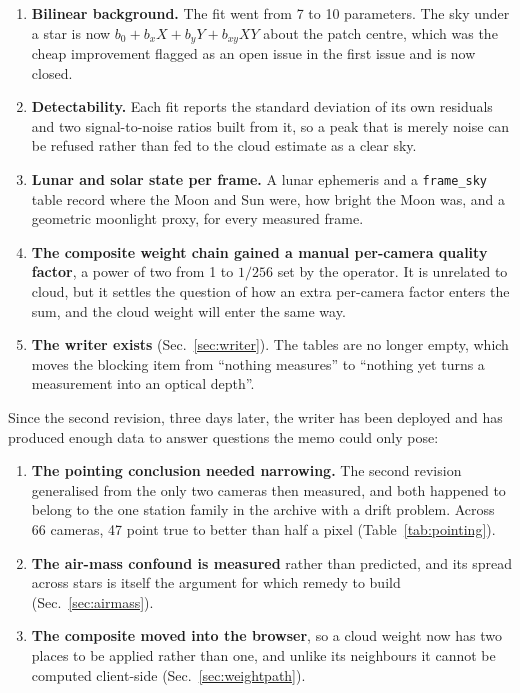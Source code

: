 \documentclass[11pt,a4paper]{article}
\begin{document}
\begin{enumerate}
  \item \textbf{Bilinear background.} The fit went from 7 to 10 parameters. The
    sky under a star is now $b_0+b_xX+b_yY+b_{xy}XY$ about the patch centre,
    which was the cheap improvement flagged as an open issue in the first issue
    and is now closed.
  \item \textbf{Detectability.} Each fit reports the standard deviation of its
    own residuals and two signal-to-noise ratios built from it, so a peak that
    is merely noise can be refused rather than fed to the cloud estimate as a
    clear sky.
  \item \textbf{Lunar and solar state per frame.} A lunar ephemeris and a
    \texttt{frame\_sky} table record where the Moon and Sun were, how bright the
    Moon was, and a geometric moonlight proxy, for every measured frame.
  \item \textbf{The composite weight chain gained a manual per-camera quality
    factor}, a power of two from 1 to $1/256$ set by the operator. It is
    unrelated to cloud, but it settles the question of how an extra per-camera
    factor enters the sum, and the cloud weight will enter the same way.
  \item \textbf{The writer exists} (Sec.~\ref{sec:writer}). The tables are no
    longer empty, which moves the blocking item from ``nothing measures'' to
    ``nothing yet turns a measurement into an optical depth''.
\end{enumerate}

\noindent Since the second revision, three days later, the writer has been
deployed and has produced enough data to answer questions the memo could only
pose:

\begin{enumerate}
  \item \textbf{The pointing conclusion needed narrowing.} The second revision
    generalised from the only two cameras then measured, and both happened to
    belong to the one station family in the archive with a drift problem. Across
    66 cameras, 47 point true to better than half a pixel
    (Table~\ref{tab:pointing}).
  \item \textbf{The air-mass confound is measured} rather than predicted, and
    its spread across stars is itself the argument for which remedy to build
    (Sec.~\ref{sec:airmass}).
  \item \textbf{The composite moved into the browser}, so a cloud weight now has
    two places to be applied rather than one, and unlike its neighbours it
    cannot be computed client-side (Sec.~\ref{sec:weightpath}).
\end{enumerate}
\end{document}
